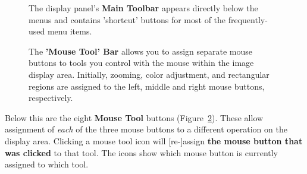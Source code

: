 \begin{figure}[h!]
\begin{center}
\caption{\label{fig:viewer_maintoolbar} The display panel's
{\bf Main Toolbar} appears directly below the menus and contains
'shortcut' buttons for most of the frequently-used menu items.}
\hrulefill
\end{center}
\end{figure}

\begin{figure}[h!]
\begin{center}
\caption{\label{fig:viewer_mousetoolbar} The 
{\bf 'Mouse Tool' Bar} allows you to assign separate mouse buttons to
tools you control with the mouse within the image display area.  Initially,
zooming, color adjustment, and rectangular regions are assigned to the left,
middle and right mouse buttons,
respectively.}
\hrulefill
\end{center}
\end{figure}

Below this are the eight {\bf Mouse Tool} buttons
(Figure~\ref{fig:viewer_mousetoolbar}). These allow assignment of
{\it each} of the three mouse buttons to a different operation on the display
area. Clicking a mouse tool icon will [re-]assign {\bf the mouse button that
was clicked} to that tool.  The icons show which mouse button is currently
assigned to which tool.  

